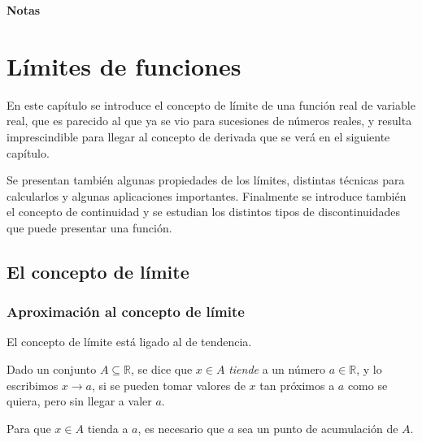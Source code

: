 \documentclass[
  a4paper,
]{scrreport}
\theoremstyle{plain}
\theoremstyle{plain}
\theoremstyle{definition}
\theoremstyle{plain}
\theoremstyle{definition}
\theoremstyle{remark}
\begin{document}
\textbf{Notas}


\hypertarget{luxedmites-de-funciones}{%
\chapter{Límites de funciones}\label{luxedmites-de-funciones}}

En este capítulo se introduce el concepto de límite de una función real
de variable real, que es parecido al que ya se vio para sucesiones de
números reales, y resulta imprescindible para llegar al concepto de
derivada que se verá en el siguiente capítulo.

Se presentan también algunas propiedades de los límites, distintas
técnicas para calcularlos y algunas aplicaciones importantes. Finalmente
se introduce también el concepto de continuidad y se estudian los
distintos tipos de discontinuidades que puede presentar una función.

\hypertarget{el-concepto-de-luxedmite}{%
\section{El concepto de límite}\label{el-concepto-de-luxedmite}}

\hypertarget{aproximaciuxf3n-al-concepto-de-luxedmite}{%
\subsection{Aproximación al concepto de
límite}\label{aproximaciuxf3n-al-concepto-de-luxedmite}}

El concepto de límite está ligado al de tendencia.

Dado un conjunto \(A\subseteq \mathbb{R}\), se dice que \(x\in A\)
\emph{tiende} a un número \(a\in\mathbb{R}\), y lo escribimos
\(x\to a\), si se pueden tomar valores de \(x\) tan próximos a \(a\)
como se quiera, pero sin llegar a valer \(a\).

\begin{tcolorbox}[enhanced jigsaw, title=\textcolor{quarto-callout-warning-color}{\faExclamationTriangle}\hspace{0.5em}{Advertencia}, opacityback=0, titlerule=0mm, colback=white, opacitybacktitle=0.6, colbacktitle=quarto-callout-warning-color!10!white, breakable, left=2mm, bottomtitle=1mm, toptitle=1mm, coltitle=black, arc=.35mm, leftrule=.75mm, toprule=.15mm, rightrule=.15mm, bottomrule=.15mm, colframe=quarto-callout-warning-color-frame]

Para que \(x\in A\) tienda a \(a\), es necesario que \(a\) sea un punto
de acumulación de \(A\).

\end{tcolorbox}
\end{document}
